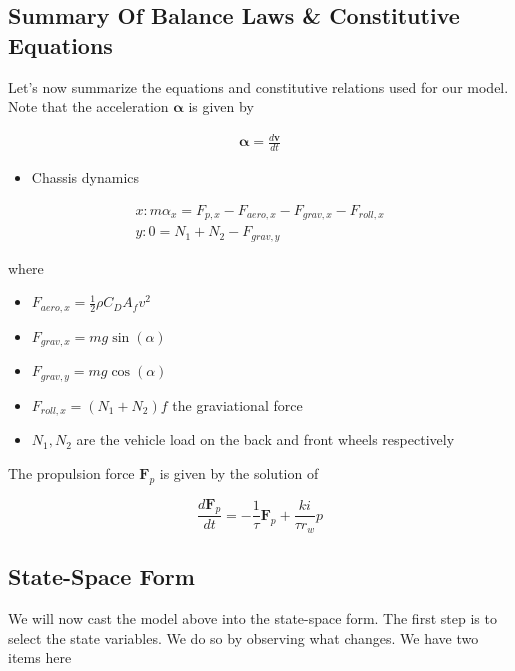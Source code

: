 \subsection{Summary Of Balance Laws \& Constitutive Equations}
Let's now summarize the equations and constitutive relations used for our model. Note that the acceleration $\boldsymbol{\alpha}$  is given by

\begin{eqnarray}
\boldsymbol{\alpha} = \frac{d \mathbf{v}}{dt}
\label{acceleration_vel_relationship}
\end{eqnarray}

\begin{itemize}
\item Chassis dynamics 
\end{itemize}

\begin{eqnarray}
x: m\alpha_x = F_{p, x} - F_{aero,x} - F_{grav, x} - F_{roll,x}  \\
y: 0 = N_1 + N_2 - F_{grav, y} 
\label{chassis_model_summary}
\end{eqnarray}

where

\begin{itemize}
\item $F_{aero,x} = \frac{1}{2}\rho C_D A_f v^2 $ 
\item $F_{grav, x} = mg \sin(\alpha)$ 
\item $F_{grav, y} = mg \cos(\alpha)$ 
\item $F_{roll,x} = (N_1 + N_2)f$ the graviational force
\item $N_1,  N_2$ are the vehicle load on the back and front wheels respectively 
\end{itemize}

The propulsion force $\mathbf{F}_p$ is given by the solution of

\begin{equation}
\frac{d\mathbf{F}_p}{dt} = - \frac{1}{\tau}\mathbf{F}_p + \frac{ki}{\tau r_w} p   
\label{engine_model_III}
\end{equation}


\subsection{State-Space Form}
We will now cast the model above into the state-space form. The first step is to select the state variables. We do so by observing what changes. We have two items here

